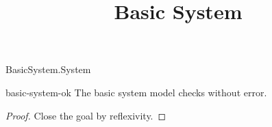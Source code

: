 \begin{lexlean}{BasicSystem.System}
\title{Basic System}

\begin{theorem}{basic-system-ok}
\noaxioms
The basic system model checks without error.
\begin{proof}
Close the goal by reflexivity.
\end{proof}
\end{theorem}

\end{lexlean}

